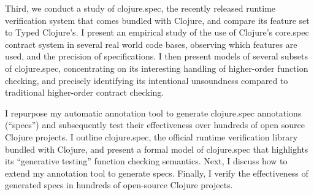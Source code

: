 Third, we conduct a study of clojure.spec, the recently released runtime verification
system that comes bundled with Clojure, and compare its feature set to Typed Clojure's.
I present an empirical study of the use of Clojure's core.spec contract system in several
real world code bases, observing which features are used, and the precision of
specifications.
I then present models of several subsets of clojure.spec, concentrating on its interesting
handling of higher-order function checking, and precisely identifying its intentional
unsoundness compared to traditional higher-order contract checking.

I repurpose my automatic annotation tool to generate clojure.spec annotations (``specs'')
and subsequently test their effectiveness over hundreds of open source Clojure projects.
I outline clojure.spec, the official runtime verification
library bundled with Clojure, and present a formal model of clojure.spec that highlights its
``generative testing'' function checking semantics.
Next, I discuss how to extend my annotation tool to generate specs.
Finally, I verify the effectiveness of generated specs in hundreds of open-source Clojure projects.


